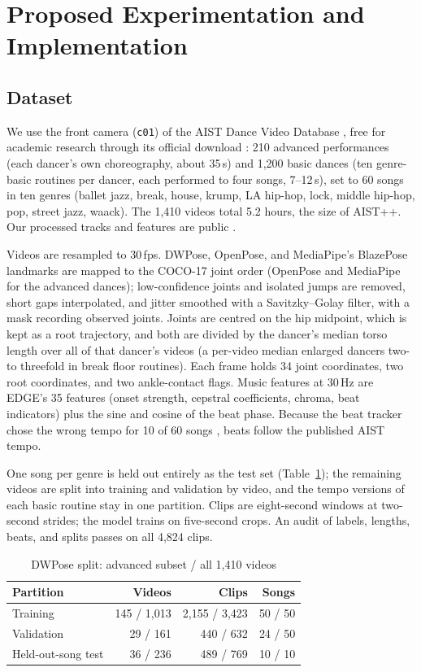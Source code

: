 \documentclass[conference,letterpaper]{IEEEtran}
\begin{document}
\section{Proposed Experimentation and Implementation}

\subsection{Dataset}
We use the front camera (\texttt{c01}) of the AIST Dance Video Database \cite{tsuchida2019}, free for academic research through its official download \cite{aistdownload}: 210 advanced performances (each dancer's own choreography, about 35\,s) and 1,200 basic dances (ten genre-basic routines per dancer, each performed to four songs, 7--12\,s), set to 60 songs in ten genres (ballet jazz, break, house, krump, LA hip-hop, lock, middle hip-hop, pop, street jazz, waack). The 1,410 videos total 5.2 hours, the size of AIST++. Our processed tracks and features are public \cite{beat2bodydata}.

Videos are resampled to 30\,fps. DWPose, OpenPose, and MediaPipe's BlazePose landmarks are mapped to the COCO-17 joint order (OpenPose and MediaPipe for the advanced dances); low-confidence joints and isolated jumps are removed, short gaps interpolated, and jitter smoothed with a Savitzky--Golay filter, with a mask recording observed joints. Joints are centred on the hip midpoint, which is kept as a root trajectory, and both are divided by the dancer's median torso length over all of that dancer's videos (a per-video median enlarged dancers two- to threefold in break floor routines). Each frame holds 34 joint coordinates, two root coordinates, and two ankle-contact flags. Music features at 30\,Hz are EDGE's 35 features (onset strength, cepstral coefficients, chroma, beat indicators) plus the sine and cosine of the beat phase. Because the beat tracker chose the wrong tempo for 10 of 60 songs \cite{beat2bodyprogress}, beats follow the published AIST tempo.

One song per genre is held out entirely as the test set (Table~\ref{tab:split}); the remaining videos are split into training and validation by video, and the tempo versions of each basic routine stay in one partition. Clips are eight-second windows at two-second strides; the model trains on five-second crops. An audit of labels, lengths, beats, and splits passes on all 4,824 clips.

\begin{table}[t]
\caption{DWPose split: advanced subset / all 1,410 videos}
\label{tab:split}
\centering
\begin{tabular}{lrrr}
\toprule
Partition & Videos & Clips & Songs \\
\midrule
Training & 145 / 1,013 & 2,155 / 3,423 & 50 / 50 \\
Validation & 29 / 161 & 440 / 632 & 24 / 50 \\
Held-out-song test & 36 / 236 & 489 / 769 & 10 / 10 \\
\bottomrule
\end{tabular}
\end{table}
\end{document}
